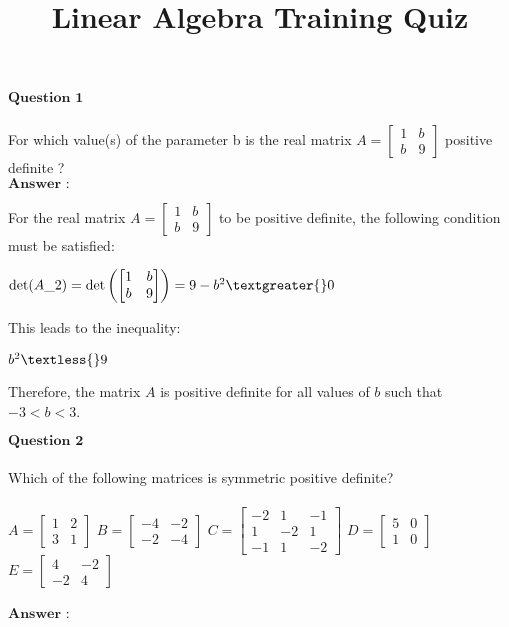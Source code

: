 \documentclass[11pt]{article}
\title{Linear Algebra Training Quiz}
\begin{document}
    
    \maketitle
    
    

    
    $\textbf{Question 1}$\\
~\\
For which value(s) of the parameter b is the real matrix
$A= \begin{bmatrix} 1 & b \\b & 9 \end{bmatrix}$ positive definite ?\\
$\textbf{Answer :}$

    For the real matrix $A = \begin{bmatrix} 1 & b \\ b & 9 \end{bmatrix}$
to be positive definite, the following condition must be satisfied:

$ \det(A\_2) = \det\left(
\begin{bmatrix} 1 & b \\ b & 9 \end{bmatrix}
\right) = 9 - b^2 \textgreater{} 0 $

This leads to the inequality:

$ b^2 \textless{} 9 $

Therefore, the matrix $A$ is positive definite for all values of $b$
such that $-3 < b < 3$.

    $\textbf{Question 2}$\\
~\\
Which of the following matrices is symmetric positive definite?\\
~\\
$A=\begin{bmatrix} 1 & 2 \\ 3 & 1 \end{bmatrix}$
$B=\begin{bmatrix} -4 & -2 \\ -2 & -4 \end{bmatrix}$
$C=\begin{bmatrix} -2 & 1 & -1 \\ 1 & -2 & 1 \\ -1 & 1 & -2 \end{bmatrix}$
$D=\begin{bmatrix} 5 & 0 \\ 1 & 0 \end{bmatrix}$
$E=\begin{bmatrix} 4 & -2 \\ -2 & 4 \end{bmatrix}$\\
~\\
$\textbf{Answer :}$
\end{document}
